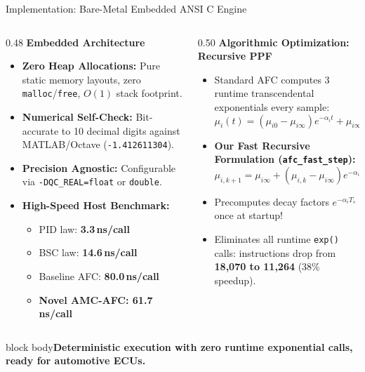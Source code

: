 \documentclass[aspectratio=169,10pt]{beamer}
\newcommand{\takeaway}[1]{\vfill\begin{beamercolorbox}[wd=\linewidth,sep=1ex]{block body}\color{accent}\bfseries #1\end{beamercolorbox}}
\begin{document}
\begin{frame}{Implementation: Bare-Metal Embedded ANSI C Engine}
\begin{columns}[T]
\begin{column}{0.48\linewidth}
{\color{accent}\bfseries Embedded Architecture}
\begin{itemize}\itemsep1.5pt\footnotesize
\item \textbf{Zero Heap Allocations:} Pure static memory layouts, zero \texttt{malloc}/\texttt{free}, $O(1)$ stack footprint.
\item \textbf{Numerical Self-Check:} Bit-accurate to 10 decimal digits against MATLAB/Octave (\texttt{-1.412611304}).
\item \textbf{Precision Agnostic:} Configurable via \texttt{-DQC\_REAL=float} or \texttt{double}.
\item \textbf{High-Speed Host Benchmark:}
\begin{itemize}\itemsep0.5pt
\item PID law: \textbf{3.3\,ns/call}
\item BSC law: \textbf{14.6\,ns/call}
\item Baseline AFC: \textbf{80.0\,ns/call}
\item \textbf{Novel AMC-AFC: 61.7\,ns/call}
\end{itemize}
\end{itemize}
\end{column}
\begin{column}{0.50\linewidth}
{\color{accent}\bfseries Algorithmic Optimization: Recursive PPF}
\begin{itemize}\itemsep1.5pt\footnotesize
\item Standard AFC computes 3 runtime transcendental exponentials every sample:
\[ \mu_i(t) = (\mu_{i0}-\mu_{i\infty})e^{-\alpha_i t} + \mu_{i\infty} \]
\item \textbf{Our Fast Recursive Formulation (\texttt{afc\_fast\_step}):}
\[ \mu_{i,k+1} = \mu_{i\infty} + (\mu_{i,k} - \mu_{i\infty}) e^{-\alpha_i T_s} \]
\item Precomputes decay factors $e^{-\alpha_i T_s}$ once at startup!
\item Eliminates all runtime \texttt{exp()} calls: instructions drop from \textbf{18,070 to 11,264} (38\% speedup).
\end{itemize}
\end{column}
\end{columns}
\par\vspace{0.05cm}
\takeaway{Deterministic execution with zero runtime exponential calls, ready for automotive ECUs.}
\end{frame}
\end{document}
